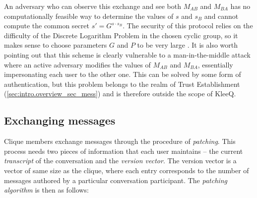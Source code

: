 \documentclass[a4paper, twoside, 12pt]{report}
\begin{document}
An adversary who can observe this exchange and see both $M_{AB}$ and $M_{BA}$ has no computationally feasible way to determine the values of $s$ and $s_B$ and cannot compute the common secret $s' = G^{s \cdot s_B}$. The security of this protocol relies on the difficulty of the Discrete Logarithm Problem \cite[sl. 77]{kuhn2016security} in the chosen cyclic group, so it makes sense to choose parameters $G$ and $P$ to be very large \cite[sl. 83]{kuhn2016security}. It is also worth pointing out  that this scheme is clearly vulnerable to a man-in-the-middle attack where an active adversary modifies the values of $M_{AB}$ and $M_{BA}$, essentially impersonating each user to the other one. This can be solved by some form of authentication, but this problem belongs to the realm of Trust Establishment (\cref{sec:intro.overview_sec_mess}) and is therefore outside the scope of KleeQ.


\subsection{Exchanging messages}
\label{subsec:prep.patching}
Clique members exchange messages through the procedure of \emph{patching}. This process needs two pieces of information that each user maintains -- the current \emph{transcript} of the conversation and the \emph{version vector}. The version vector is a vector of same size as the clique, where each entry corresponds to the number of messages authored by a particular conversation participant. The \emph{patching algorithm} is then as follows:
\end{document}
